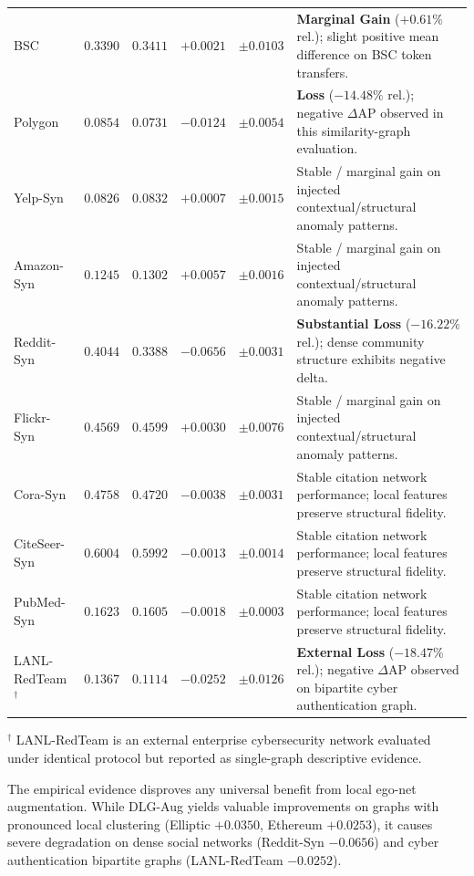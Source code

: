 \documentclass[applsci,article,submit,moreauthors,pdftex]{Definitions/mdpi}
\begin{document}
\begin{table}[htbp]
\begin{tabularx}{\textwidth}{lrrrr>{\raggedright\arraybackslash}X}
BSC & $0.3390$ & $0.3411$ & $+0.0021$ & $\pm 0.0103$ & \textbf{Marginal Gain} ($+0.61\%$ rel.); slight positive mean difference on BSC token transfers. \\
Polygon & $0.0854$ & $0.0731$ & $-0.0124$ & $\pm 0.0054$ & \textbf{Loss} ($-14.48\%$ rel.); negative $\Delta\mathrm{AP}$ observed in this similarity-graph evaluation. \\
Yelp-Syn & $0.0826$ & $0.0832$ & $+0.0007$ & $\pm 0.0015$ & Stable / marginal gain on injected contextual/structural anomaly patterns. \\
Amazon-Syn & $0.1245$ & $0.1302$ & $+0.0057$ & $\pm 0.0016$ & Stable / marginal gain on injected contextual/structural anomaly patterns. \\
Reddit-Syn & $0.4044$ & $0.3388$ & $\mathbf{-0.0656}$ & $\pm 0.0031$ & \textbf{Substantial Loss} ($-16.22\%$ rel.); dense community structure exhibits negative delta. \\
Flickr-Syn & $0.4569$ & $0.4599$ & $+0.0030$ & $\pm 0.0076$ & Stable / marginal gain on injected contextual/structural anomaly patterns. \\
Cora-Syn & $0.4758$ & $0.4720$ & $-0.0038$ & $\pm 0.0031$ & Stable citation network performance; local features preserve structural fidelity. \\
CiteSeer-Syn & $0.6004$ & $0.5992$ & $-0.0013$ & $\pm 0.0014$ & Stable citation network performance; local features preserve structural fidelity. \\
PubMed-Syn & $0.1623$ & $0.1605$ & $-0.0018$ & $\pm 0.0003$ & Stable citation network performance; local features preserve structural fidelity. \\
LANL-RedTeam$^{\dagger}$ & $0.1367$ & $0.1114$ & $-0.0252$ & $\pm 0.0126$ & \textbf{External Loss} ($-18.47\%$ rel.); negative $\Delta\mathrm{AP}$ observed on bipartite cyber authentication graph. \\
\bottomrule
\end{tabularx}
\begin{tablenotes}\footnotesize
\item $^{\dagger}$ LANL-RedTeam is an external enterprise cybersecurity network evaluated under identical protocol but reported as single-graph descriptive evidence.
\end{tablenotes}
\end{table}


The empirical evidence disproves any universal benefit from local ego-net augmentation. While DLG-Aug yields valuable improvements on graphs with pronounced local clustering (Elliptic $+0.0350$, Ethereum $+0.0253$), it causes severe degradation on dense social networks (Reddit-Syn $-0.0656$) and cyber authentication bipartite graphs (LANL-RedTeam $-0.0252$).
\end{document}
